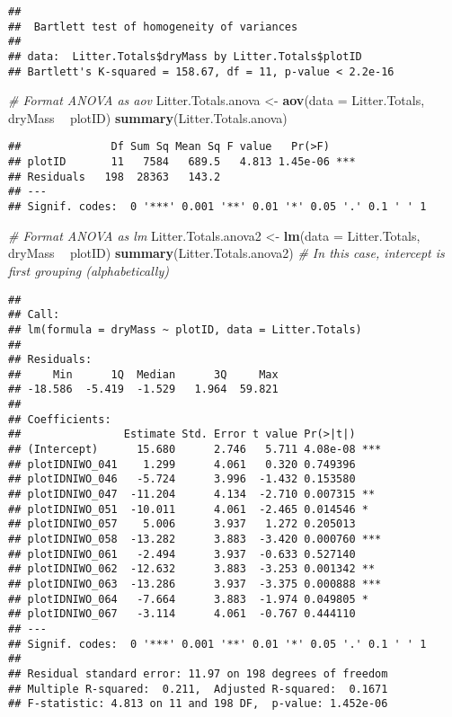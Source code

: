 \documentclass[
]{article}
\newenvironment{Shaded}{\begin{snugshade}}{\end{snugshade}}
\newcommand{\CommentTok}[1]{\textcolor[rgb]{0.56,0.35,0.01}{\textit{#1}}}
\newcommand{\DataTypeTok}[1]{\textcolor[rgb]{0.13,0.29,0.53}{#1}}
\newcommand{\KeywordTok}[1]{\textcolor[rgb]{0.13,0.29,0.53}{\textbf{#1}}}
\newcommand{\NormalTok}[1]{#1}
\newcommand{\OperatorTok}[1]{\textcolor[rgb]{0.81,0.36,0.00}{\textbf{#1}}}
\newcommand{\StringTok}[1]{\textcolor[rgb]{0.31,0.60,0.02}{#1}}
\begin{document}
\begin{verbatim}
## 
##  Bartlett test of homogeneity of variances
## 
## data:  Litter.Totals$dryMass by Litter.Totals$plotID
## Bartlett's K-squared = 158.67, df = 11, p-value < 2.2e-16
\end{verbatim}

\begin{Shaded}
\begin{Highlighting}[]
\CommentTok{# Format ANOVA as aov}
\NormalTok{Litter.Totals.anova <-}\StringTok{ }\KeywordTok{aov}\NormalTok{(}\DataTypeTok{data =}\NormalTok{ Litter.Totals, dryMass }\OperatorTok{~}\StringTok{ }\NormalTok{plotID)}
\KeywordTok{summary}\NormalTok{(Litter.Totals.anova)}
\end{Highlighting}
\end{Shaded}

\begin{verbatim}
##              Df Sum Sq Mean Sq F value   Pr(>F)    
## plotID       11   7584   689.5   4.813 1.45e-06 ***
## Residuals   198  28363   143.2                     
## ---
## Signif. codes:  0 '***' 0.001 '**' 0.01 '*' 0.05 '.' 0.1 ' ' 1
\end{verbatim}

\begin{Shaded}
\begin{Highlighting}[]
\CommentTok{# Format ANOVA as lm}
\NormalTok{Litter.Totals.anova2 <-}\StringTok{ }\KeywordTok{lm}\NormalTok{(}\DataTypeTok{data =}\NormalTok{ Litter.Totals, dryMass }\OperatorTok{~}\StringTok{ }\NormalTok{plotID)}
\KeywordTok{summary}\NormalTok{(Litter.Totals.anova2) }\CommentTok{# In this case, intercept is first grouping (alphabetically)}
\end{Highlighting}
\end{Shaded}

\begin{verbatim}
## 
## Call:
## lm(formula = dryMass ~ plotID, data = Litter.Totals)
## 
## Residuals:
##     Min      1Q  Median      3Q     Max 
## -18.586  -5.419  -1.529   1.964  59.821 
## 
## Coefficients:
##                Estimate Std. Error t value Pr(>|t|)    
## (Intercept)      15.680      2.746   5.711 4.08e-08 ***
## plotIDNIWO_041    1.299      4.061   0.320 0.749396    
## plotIDNIWO_046   -5.724      3.996  -1.432 0.153580    
## plotIDNIWO_047  -11.204      4.134  -2.710 0.007315 ** 
## plotIDNIWO_051  -10.011      4.061  -2.465 0.014546 *  
## plotIDNIWO_057    5.006      3.937   1.272 0.205013    
## plotIDNIWO_058  -13.282      3.883  -3.420 0.000760 ***
## plotIDNIWO_061   -2.494      3.937  -0.633 0.527140    
## plotIDNIWO_062  -12.632      3.883  -3.253 0.001342 ** 
## plotIDNIWO_063  -13.286      3.937  -3.375 0.000888 ***
## plotIDNIWO_064   -7.664      3.883  -1.974 0.049805 *  
## plotIDNIWO_067   -3.114      4.061  -0.767 0.444110    
## ---
## Signif. codes:  0 '***' 0.001 '**' 0.01 '*' 0.05 '.' 0.1 ' ' 1
## 
## Residual standard error: 11.97 on 198 degrees of freedom
## Multiple R-squared:  0.211,  Adjusted R-squared:  0.1671 
## F-statistic: 4.813 on 11 and 198 DF,  p-value: 1.452e-06
\end{verbatim}
\end{document}
